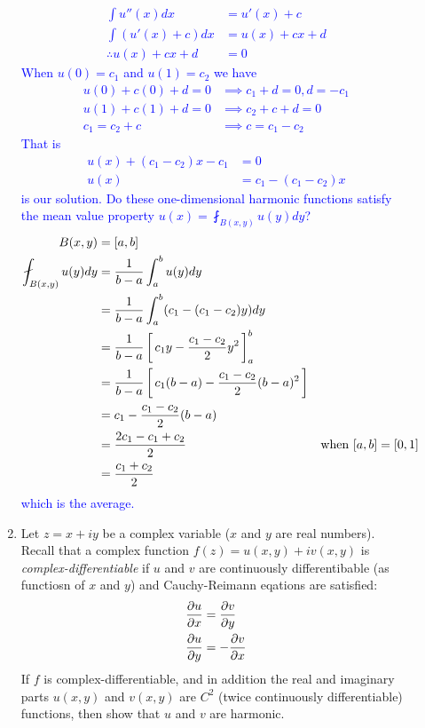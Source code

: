 \documentclass[10pt,a4paper]{report}
\newcommand{\BLUE}[1]{\textcolor{blue}{#1}}
\begin{document}
\begin{description}
\begin{enumerate}
		\BLUE{\begin{align*}
			\int u''(x)dx &= u'(x) + c \\
			\int (u'(x) + c)dx &= u(x)+cx+d \\
			\therefore u(x)+cx+d &= 0
		\end{align*}When $u(0)=c_1$ and $u(1) = c_2$ we have
		\begin{align*}
			u(0)+c(0)+d = 0 &\implies c_1+d=0, d=-c_1 \\
			u(1)+c(1)+d = 0 &\implies c_2+c+d=0 \\
			c_1 = c_2+c &\implies c=c_1-c_2
		\end{align*}That is
		\begin{align*}
			u(x) +(c_1-c_2)x-c_1 &=0 \\
			u(x) &= c_1-(c_1-c_2)x
		\end{align*}is our solution.  Do these one-dimensional harmonic functions satisfy the mean value property $u(x)=\fint_{B(x,y)}u(y)dy$?
		\begin{align*}
			B(x,y) &= [a,b]\\
			\fint_{B(x,y)}u(y)dy &= \frac{1}{b-a}\int_a^b u(y)dy \\
			&= \frac{1}{b-a}\int_a^b(c_1-(c_1-c_2)y) dy	\\
			&= \frac{1}{b-a}\SQBRACKET{c_1y - \frac{c_1-c_2}{2}y^2}_a^b \\
			&=\frac{1}{b-a}\SQBRACKET{c_1(b-a) - \frac{c_1-c_2}{2}(b-a)^2} \\
			&= c_1 - \frac{c_1-c_2}{2}(b-a) \\
			&= \frac{2c_1-c_1+c_2}{2} & \text{when }[a,b] = [0,1] \\
			&= \frac{c_1+c_2}{2}
		\end{align*}which is the average.		}
				
		\item Let $z=x+iy$ be a complex variable ($x$ and $y$ are real numbers).  Recall that a complex function $f(z)=u(x,y)+iv(x,y)$ is \textit{complex-differentiable} if $u$ and $v$ are continuously differentibable (as functiosn of $x$ and $y$) and Cauchy-Reimann eqations are satisfied:
		\begin{align*}
			\frac{\partial u}{\partial x}&=\frac{\partial v}{\partial y}\\
			\frac{\partial u}{\partial y}&=-\frac{\partial v}{\partial x}
		\end{align*}If $f$ is complex-differentiable, and in addition the real and imaginary parts $u(x,y)$ and $v(x,y)$ are $C^2$ (twice continuously differentiable) functions, then show that $u$ and $v$ are harmonic.
		

\end{enumerate}
\end{description}
\end{document}
